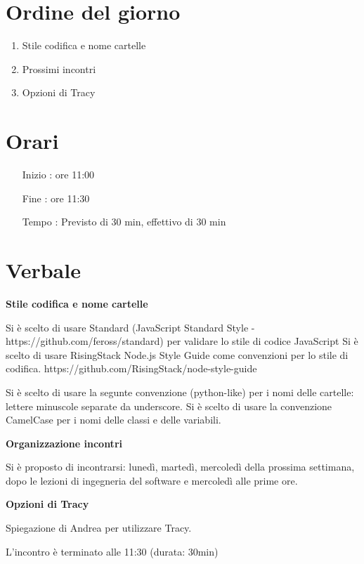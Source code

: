 \documentclass[11pt]{meetingmins}
\begin{document}
\maketitle

\section{Ordine del giorno}

\begin{enumerate}

  \item Stile codifica e nome cartelle
  \item Prossimi incontri
  \item Opzioni di Tracy

\end{enumerate}

\section{Orari}

\begin{itemize}
\item[Inizio]: ore 11:00
\item[Fine]: ore 11:30
\item[Tempo]: Previsto di 30 min, effettivo di 30 min

\end{itemize}

\section{Verbale}

\textbf{Stile codifica e nome cartelle}

Si \`{e} scelto di usare Standard (JavaScript Standard Style - https://github.com/feross/standard) per validare lo stile di codice JavaScript
Si \`{e} scelto di usare RisingStack Node.js Style Guide come convenzioni per lo stile di codifica. https://github.com/RisingStack/node-style-guide

Si \`{e} scelto di usare la segunte convenzione (python-like) per i nomi delle cartelle: lettere minuscole separate da underscore.
Si \`{e} scelto di usare la convenzione CamelCase per i nomi delle classi e delle variabili.

\textbf{Organizzazione incontri}

Si \`{e} proposto di incontrarsi: luned\`{i}, marted\`{i}, mercoled\`{i} della prossima settimana, dopo le lezioni di ingegneria del software e mercoled\`{i} alle prime ore.

\textbf{Opzioni di Tracy}

Spiegazione di Andrea per utilizzare Tracy.

L'incontro è terminato alle 11:30 (durata: 30min)\\

\end{document}
